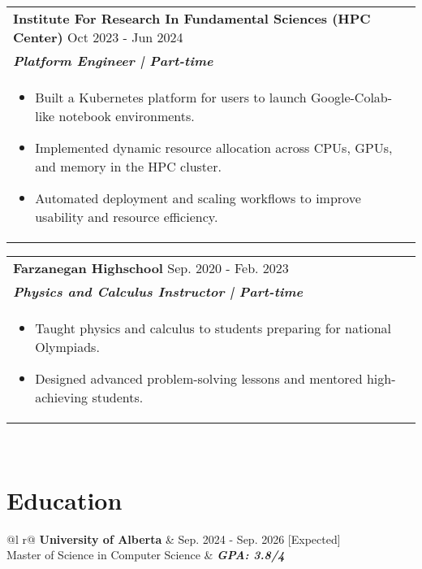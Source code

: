\documentclass[a4paper,8pt]{article}
\begin{document}
\begin{tabularx}{\linewidth}{ @{}l r@{} }
\color[HTML]{1C033C} \textbf{{Institute For Research In Fundamental Sciences (HPC Center)}} \hfill \color[HTML]{371e77} Oct 2023 - Jun 2024 \\[4pt]
\color[HTML]{371e77}\textbf{\textit{Platform Engineer | Part-time}}\ \hfill \color[HTML]{4B28A4} \\[5pt]
\begin{minipage}[t]{\linewidth}
    \begin{itemize}[nosep,after=\strut, leftmargin=2em, itemsep=2pt]
        \item{Built a Kubernetes platform for users to launch Google-Colab-like notebook environments.
        }
        \item {Implemented dynamic resource allocation across CPUs, GPUs, and memory in the HPC cluster.
        }
        \item{Automated deployment and scaling workflows to improve usability and resource efficiency.}   
    \end{itemize}
\end{minipage}
\end{tabularx}

\begin{tabularx}{\linewidth}{ @{}l r@{} }
\color[HTML]{1C033C} \textbf{Farzanegan Highschool} \hfill \color[HTML]{371e77} Sep. 2020 - Feb. 2023 \\[4pt]
\color[HTML]{371e77}\textbf{\textit{Physics and Calculus Instructor | Part-time}} \hfill \color[HTML]{4B28A4} \\[5pt]
\begin{minipage}[t]{\linewidth}
    \begin{itemize}[nosep,after=\strut, leftmargin=2em, itemsep=2pt]
        \item {Taught physics and calculus to students preparing for national Olympiads.}
        \item {Designed advanced problem-solving lessons and mentored high-achieving students.}
    \end{itemize}
    \end{minipage}
\end{tabularx}\\[3pt]

\section{Education}
\begin{tabularx}{\linewidth}{ @{}l r@{} }
\color[HTML]{1C033C} \textbf{University of Alberta} & \hfill \color[HTML]{371e77} Sep. 2024 - Sep. 2026 [Expected] \\
\color[HTML]{371e77} Master of Science in Computer Science & \hfill \color[HTML]{4B28A4} \textit{\textbf{GPA: 3.8/4}} \\
\end{tabularx}\\[3pt]
\end{document}
